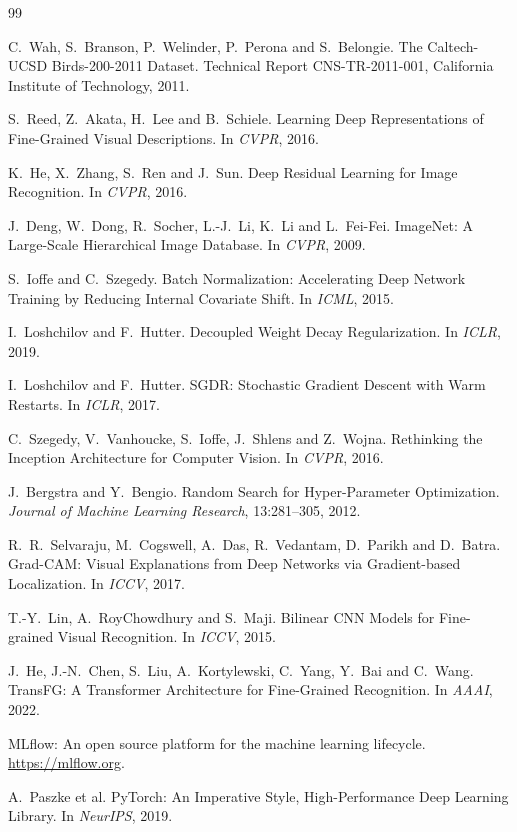 \documentclass[11pt,a4paper]{article}
\begin{document}
\begin{thebibliography}{99}

C.~Wah, S.~Branson, P.~Welinder, P.~Perona and S.~Belongie.
\newblock The Caltech-UCSD Birds-200-2011 Dataset.
\newblock Technical Report CNS-TR-2011-001, California Institute of Technology, 2011.

S.~Reed, Z.~Akata, H.~Lee and B.~Schiele.
\newblock Learning Deep Representations of Fine-Grained Visual Descriptions.
\newblock In \emph{CVPR}, 2016.

K.~He, X.~Zhang, S.~Ren and J.~Sun.
\newblock Deep Residual Learning for Image Recognition.
\newblock In \emph{CVPR}, 2016.

J.~Deng, W.~Dong, R.~Socher, L.-J.~Li, K.~Li and L.~Fei-Fei.
\newblock ImageNet: A Large-Scale Hierarchical Image Database.
\newblock In \emph{CVPR}, 2009.

S.~Ioffe and C.~Szegedy.
\newblock Batch Normalization: Accelerating Deep Network Training by Reducing
Internal Covariate Shift.
\newblock In \emph{ICML}, 2015.

I.~Loshchilov and F.~Hutter.
\newblock Decoupled Weight Decay Regularization.
\newblock In \emph{ICLR}, 2019.

I.~Loshchilov and F.~Hutter.
\newblock SGDR: Stochastic Gradient Descent with Warm Restarts.
\newblock In \emph{ICLR}, 2017.

C.~Szegedy, V.~Vanhoucke, S.~Ioffe, J.~Shlens and Z.~Wojna.
\newblock Rethinking the Inception Architecture for Computer Vision.
\newblock In \emph{CVPR}, 2016.

J.~Bergstra and Y.~Bengio.
\newblock Random Search for Hyper-Parameter Optimization.
\newblock \emph{Journal of Machine Learning Research}, 13:281--305, 2012.

R.~R.~Selvaraju, M.~Cogswell, A.~Das, R.~Vedantam, D.~Parikh and D.~Batra.
\newblock Grad-CAM: Visual Explanations from Deep Networks via Gradient-based
Localization.
\newblock In \emph{ICCV}, 2017.

T.-Y.~Lin, A.~RoyChowdhury and S.~Maji.
\newblock Bilinear CNN Models for Fine-grained Visual Recognition.
\newblock In \emph{ICCV}, 2015.

J.~He, J.-N.~Chen, S.~Liu, A.~Kortylewski, C.~Yang, Y.~Bai and C.~Wang.
\newblock TransFG: A Transformer Architecture for Fine-Grained Recognition.
\newblock In \emph{AAAI}, 2022.

MLflow: An open source platform for the machine learning lifecycle.
\newblock \url{https://mlflow.org}.

A.~Paszke et al.
\newblock PyTorch: An Imperative Style, High-Performance Deep Learning Library.
\newblock In \emph{NeurIPS}, 2019.

\end{thebibliography}
\end{document}

